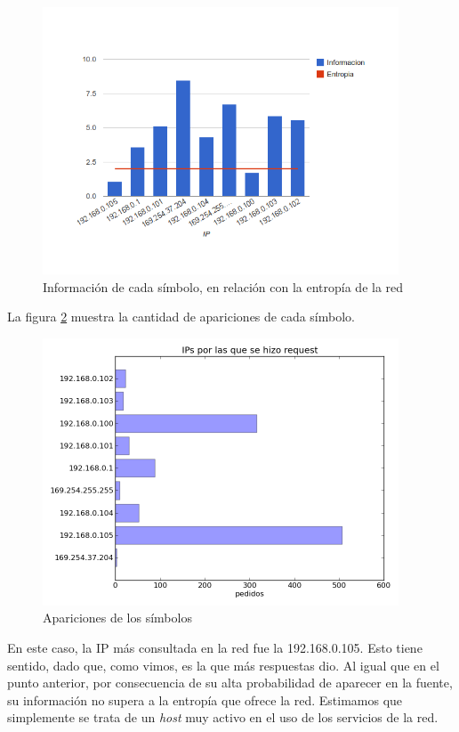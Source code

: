 \documentclass{article}
\begin{document}
\begin{figure}[h!]
    \centering                                                       
    \includegraphics[width=300pt]{consultadas1.png}
    \caption{Información de cada símbolo, en relación con la
        entropía de la red}
    \label{fig:red1requested:infoentro}
\end{figure}

La figura \ref{fig:red1requested:count} muestra la cantidad de apariciones de
cada símbolo.

\begin{figure}[h!]
    \centering
    \includegraphics[width=300pt]{red1requested.png}
    \caption{Apariciones de los símbolos}
    \label{fig:red1requested:count}
\end{figure}

En este caso, la IP más consultada en la red fue la 192.168.0.105. Esto tiene
sentido, dado que, como vimos, es la que más respuestas dio. Al igual que en
el punto anterior, por consecuencia de su alta probabilidad de aparecer en la
fuente, su información no supera a la entropía que ofrece la red. Estimamos
que simplemente se trata de un \emph{host} muy activo en el uso de los
servicios de la red.
\end{document}
